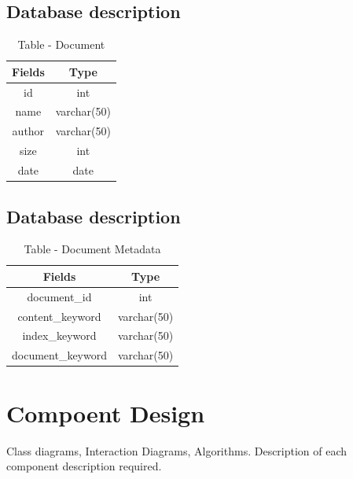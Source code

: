 \documentclass[oneside,a4paper,12pt]{report}
\begin{document}
{\subsection{Database description}
\begin{table}[!htbp]
\begin{center}
\def\arraystretch{1.5}
  \begin{tabular}{| c | c |}
       \hline
       
Fields & Type \\ \hline
id & int \\ \hline
name & varchar(50) \\ \hline
author & varchar(50) \\ \hline
size & int \\ \hline
date & date \\ \hline
       
\end{tabular}
 \caption { Table - Document  }
 \label{tab:hreq}
\end{center}

\end{table}

\subsection{Database description}
\begin{table}[!htbp]
\begin{center}
\def\arraystretch{1.5}
  \begin{tabular}{| c | c |}
       \hline
       
Fields & Type \\ \hline
document\_id & int \\ \hline
content\_keyword & varchar(50) \\ \hline
index\_keyword & varchar(50) \\ \hline
document\_keyword & varchar(50) \\ \hline
       
\end{tabular}
 \caption { Table - Document Metadata  }
 \label{tab:hreq}
\end{center}

\end{table}


\section{Compoent Design} 
Class diagrams, Interaction Diagrams, Algorithms. Description of each component description required.
}
\end{document}
